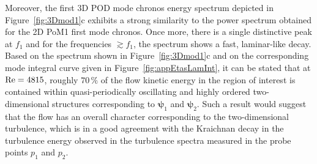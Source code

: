 {%

{Moreover, the first 3D POD mode chronos {energy} spectrum depicted in Figure~\ref{fig:3Dmod1}c exhibits a strong similarity to the power spectrum obtained for the 2D PoM1 first mode chronos. Once more, there is a single distinctive peak at $f_{1}$ and for the frequencies $\gtrsim f_{1}$, {the spectrum shows a fast, laminar-like decay. Based on the spectrum shown in Figure~\ref{fig:3Dmod1}c and on the corresponding mode integral curve given in Figure~\ref{fig:appEtasLamInt}, it can be stated that at $\mathrm{Re} = 4815$, roughly $70\,\%$ of the flow kinetic energy} in the region of interest is contained within quasi-periodically oscillating and highly ordered two-dimensional structures corresponding to $\bm{\psi}_{1}$ and $\bm{\psi}_{2}$. Such a result would suggest that the flow has an overall character corresponding to the two-dimensional turbulence, which is in a good agreement with the  Kraichnan decay in the turbulence energy observed in the turbulence spectra measured in the probe points $p_{1}$ and $p_{2}$.



}}
